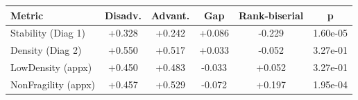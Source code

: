 \begin{tabular}{lccccc}
\toprule
Metric & Disadv. & Advant. & Gap & Rank-biserial & p \\
\midrule
Stability (Diag 1) & +0.328 & +0.242 & +0.086 & -0.229 & 1.60e-05 \\
Density (Diag 2) & +0.550 & +0.517 & +0.033 & -0.052 & 3.27e-01 \\
LowDensity (appx) & +0.450 & +0.483 & -0.033 & +0.052 & 3.27e-01 \\
NonFragility (appx) & +0.457 & +0.529 & -0.072 & +0.197 & 1.95e-04 \\
\bottomrule
\end{tabular}
